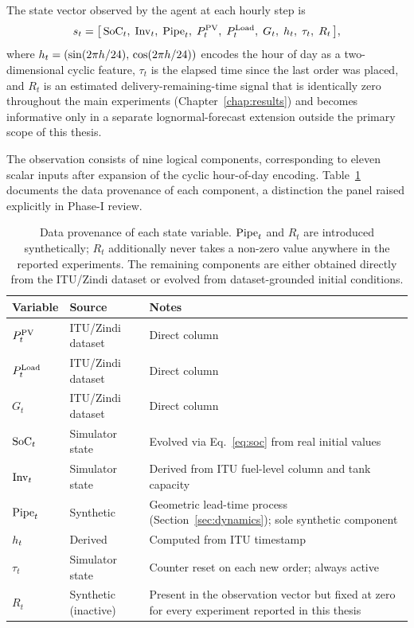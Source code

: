 The state vector observed by the agent at each hourly step is
\begin{equation}
s_t = \bigl[\,
  \SoC_t,\;
  \Inv_t,\;
  \Pipe_t,\;
  P_t^{\PV},\;
  P_t^{\Load},\;
  G_t,\;
  \hour_t,\;
  \tau_t,\;
  R_t
\,\bigr],
\label{eq:state}
\end{equation}
where $\hour_t = (\sin(2\pi h/24),\,\cos(2\pi h/24))$ encodes the hour of
day as a two-dimensional cyclic feature, $\tau_t$ is the elapsed time
since the last order was placed, and $R_t$ is an estimated
delivery-remaining-time signal that is identically zero throughout the
main experiments (Chapter~\ref{chap:results}) and becomes informative
only in a separate lognormal-forecast extension outside the primary
scope of this thesis.

The observation consists of nine logical components, corresponding to
eleven scalar inputs after expansion of the cyclic hour-of-day encoding.
Table~\ref{tab:state_sources} documents the data provenance of
each component, a distinction the panel raised explicitly in Phase-I review.

\begin{table}[ht]
\centering
\small
\begin{tabular}{p{2.1cm}p{3.1cm}p{9cm}}
\toprule
\textbf{Variable} & \textbf{Source} & \textbf{Notes} \\
\midrule
$P_t^{\PV}$   & ITU/Zindi dataset  & Direct column \\
$P_t^{\Load}$ & ITU/Zindi dataset  & Direct column \\
$G_t$         & ITU/Zindi dataset  & Direct column \\
$\SoC_t$      & Simulator state    & Evolved via Eq.~\eqref{eq:soc} from real initial values \\
$\Inv_t$      & Simulator state    & Derived from ITU fuel-level column and tank capacity \\
$\Pipe_t$     & Synthetic          & Geometric lead-time process (Section~\ref{sec:dynamics}); sole synthetic component \\
$\hour_t$     & Derived            & Computed from ITU timestamp \\
$\tau_t$      & Simulator state    & Counter reset on each new order; always active \\
$R_t$         & Synthetic (inactive) & Present in the observation vector but fixed at zero for
                                       every experiment reported in this thesis \\
\bottomrule
\end{tabular}
\caption{Data provenance of each state variable. $\Pipe_t$ and $R_t$ are
introduced synthetically; $R_t$ additionally never takes a non-zero
value anywhere in the reported experiments. The remaining components are
either obtained directly from the ITU/Zindi dataset or evolved from
dataset-grounded initial conditions.}
\label{tab:state_sources}
\end{table}

